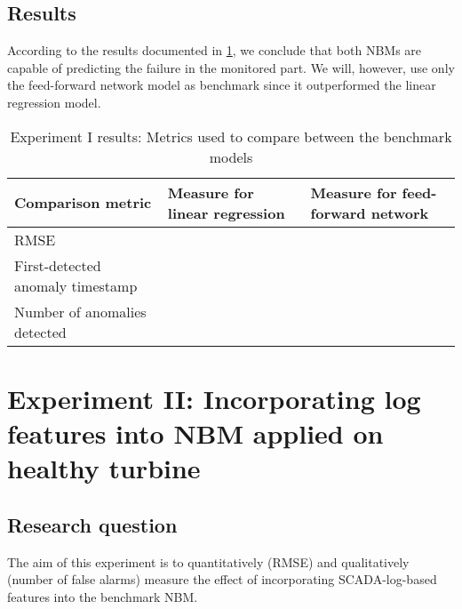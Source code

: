 \subsection{Results}
According to the results documented in \ref{tab:Experiment I results}, we conclude that both NBMs are capable of predicting the failure in the monitored part. We will, however, use only the feed-forward network model as benchmark since it outperformed the linear regression model.
\begin{table}[H]
        \centering
    \begin{tabular}{|m{4cm}|m{4cm}|m{4cm}|}
    \hline
         \textbf{Comparison metric} & \textbf{Measure for linear regression}   & \textbf{Measure for feed-forward network}\\
         \hline
         RMSE & & \\
         \hline
         First-detected anomaly timestamp & & \\
         \hline
         Number of anomalies detected & & \\
         \hline
    \hline
    \end{tabular}
    \caption{Experiment I results: Metrics used to compare between the benchmark models}
        \label{tab:Experiment I results}
\end{table}


\section{Experiment II: Incorporating log features into NBM applied on healthy turbine}

\subsection{Research question}
The aim of this experiment is to quantitatively (RMSE) and qualitatively (number of false alarms) measure the effect of incorporating SCADA-log-based features into the benchmark NBM.

